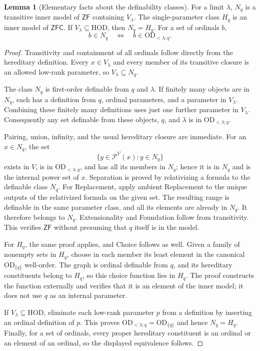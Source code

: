 \documentclass[11pt,letterpaper]{article}
\theoremstyle{definition}
\newtheorem{lemma}[definition]{Lemma}
\numberwithin{equation}{section}
\newcommand{\ZFC}{\mathsf{ZFC}}
\newcommand{\ZF}{\mathsf{ZF}}
\newcommand{\HOD}{\mathrm{HOD}}
\newcommand{\OD}{\mathrm{OD}}
\newcommand{\Pow}{\mathcal P}
\newcommand{\ODq}{\OD_{<\lambda;q}}
\newcommand{\ODone}[1]{\OD_{\{#1\}}}
\begin{document}
\begin{lemma}[Elementary facts about the definability classes]\label{lem:hodbasics}
For a limit $\lambda$, $N_q$ is a transitive inner model of $\ZF$ containing $V_\lambda$. The single-parameter class $H_q$ is an inner model of $\ZFC$. If $V_\lambda\subseteq\HOD$, then $N_q=H_q$.
For a set of ordinals $b$,
\[
b\in N_q\quad\Longleftrightarrow\quad b\in\ODq.
\]
\end{lemma}

\begin{proof}
Transitivity and containment of all ordinals follow directly from the hereditary definition. Every $x\in V_\lambda$ and every member of its transitive closure is an allowed low-rank parameter, so $V_\lambda\subseteq N_q$.

The class $N_q$ is first-order definable from $q$ and $\lambda$. If finitely many objects are in $N_q$, each has a definition from $q$, ordinal parameters, and a parameter in $V_\lambda$. Combining these finitely many definitions uses just one further parameter in $V_\lambda$. Consequently any set definable from these objects, $q$, and $\lambda$ is in $\ODq$.

Pairing, union, infinity, and the usual hereditary closure are immediate. For an $x\in N_q$, the set
\[
\{y\in\Pow^V(x):y\in N_q\}
\]
exists in $V$, is in $\ODq$, and has all its members in $N_q$; hence it is in $N_q$ and is the internal power set of $x$. Separation is proved by relativizing a formula to the definable class $N_q$. For Replacement, apply ambient Replacement to the unique outputs of the relativized formula on the given set. The resulting range is definable in the same parameter class, and all its elements are already in $N_q$. It therefore belongs to $N_q$. Extensionality and Foundation follow from transitivity. This verifies $\ZF$ without presuming that $q$ itself is in the model.

For $H_q$, the same proof applies, and Choice follows as well. Given a family of nonempty sets in $H_q$, choose in each member its least element in the canonical $\ODone{q}$ well-order. The graph is ordinal definable from $q$, and its hereditary constituents belong to $H_q$, so this choice function lies in $H_q$. The proof constructs the function externally and verifies that it is an element of the inner model; it does not use $q$ as an internal parameter.

If $V_\lambda\subseteq\HOD$, eliminate each low-rank parameter $p$ from a definition by inserting an ordinal definition of $p$. This proves $\ODq=\ODone{q}$ and hence $N_q=H_q$. Finally, for a set of ordinals, every proper hereditary constituent is an ordinal or an element of an ordinal, so the displayed equivalence follows.
\end{proof}
\end{document}
